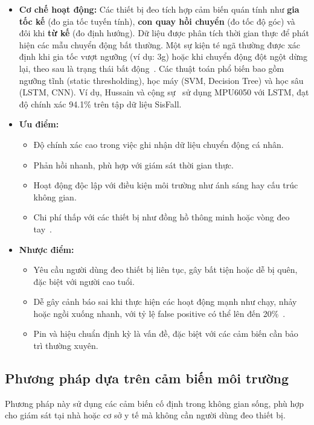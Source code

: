 \begin{itemize}
    \item \textbf{Cơ chế hoạt động:} Các thiết bị đeo tích hợp cảm biến quán tính như \textbf{gia tốc kế} (đo gia tốc tuyến tính), \textbf{con quay hồi chuyển} (đo tốc độ góc) và đôi khi \textbf{từ kế} (đo định hướng). Dữ liệu được phân tích thời gian thực để phát hiện các mẫu chuyển động bất thường. Một sự kiện té ngã thường được xác định khi gia tốc vượt ngưỡng (ví dụ: 3g) hoặc khi chuyển động đột ngột dừng lại, theo sau là trạng thái bất động~\cite{xu2023}. Các thuật toán phổ biến bao gồm ngưỡng tĩnh (static thresholding), học máy (SVM, Decision Tree) và học sâu (LSTM, CNN). Ví dụ, Hussain và cộng sự~\cite{hussain2019} sử dụng MPU6050 với LSTM, đạt độ chính xác 94.1\% trên tập dữ liệu SisFall.
    \item \textbf{Ưu điểm:} 
    \begin{itemize}
        \item Độ chính xác cao trong việc ghi nhận dữ liệu chuyển động cá nhân.
        \item Phản hồi nhanh, phù hợp với giám sát thời gian thực.
        \item Hoạt động độc lập với điều kiện môi trường như ánh sáng hay cấu trúc không gian.
        \item Chi phí thấp với các thiết bị như đồng hồ thông minh hoặc vòng đeo tay~\cite{wearable20152024}.
    \end{itemize}
    \item \textbf{Nhược điểm:}
    \begin{itemize}
        \item Yêu cầu người dùng đeo thiết bị liên tục, gây bất tiện hoặc dễ bị quên, đặc biệt với người cao tuổi.
        \item Dễ gây cảnh báo sai khi thực hiện các hoạt động mạnh như chạy, nhảy hoặc ngồi xuống nhanh, với tỷ lệ false positive có thể lên đến 20\%~\cite{alarifi2021}.
        \item Pin và hiệu chuẩn định kỳ là vấn đề, đặc biệt với các cảm biến cần bảo trì thường xuyên.
    \end{itemize}
\end{itemize}

\subsection{Phương pháp dựa trên cảm biến môi trường}

Phương pháp này sử dụng các cảm biến cố định trong không gian sống, phù hợp cho giám sát tại nhà hoặc cơ sở y tế mà không cần người dùng đeo thiết bị.

